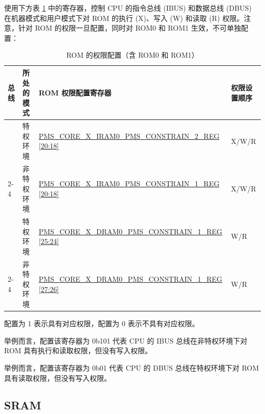 \documentclass[main\_\_CN.tex]{subfiles}
\begin{document}
\chipname{} 使用下方表 \ref{tab:permctrl-rom_permconfig} 中的寄存器，控制 CPU 的指令总线 (IBUS) 和数据总线 (DBUS) 在机器模式和用户模式下对 ROM 的执行 (X)、写入 (W) 和读取 (R) 权限。注意，针对 ROM 的权限一旦配置，同时对 ROM0 和 ROM1 生效，不可单独配置：

\begin{table}[H]
    \centering
    \caption{ROM 的权限配置（含 ROM0 和 ROM1）}
    \label{tab:permctrl-rom_permconfig}
    \begin{threeparttable}
    \begin{tabular}{|l|l|l|l|}
        \hline
        \rowcolor{lightgray}
        \textbf{总线} & \textbf{所处的模式} & \textbf{ROM 权限配置寄存器\tnote{A}}                         & \textbf{权限设置顺序} \\ \hline
                     & 特权环境      & \hyperref[regdesc:PMSCOREXIRAM0PMSCONSTRAIN2REG]{PMS\_CORE\_X\_IRAM0\_PMS\_CONSTRAIN\_2\_REG   {[}20:18{]}}\tnote{B} & X/W/R           \\ \cline{2-4}
        \multirow{-2}{*}{IBUS} & 非特权环境 & \hyperref[regdesc:PMSCOREXIRAM0PMSCONSTRAIN1REG]{PMS\_CORE\_X\_IRAM0\_PMS\_CONSTRAIN\_1\_REG {[}20:18{]}}\tnote{B}    & X/W/R \\ \hline
                     & 特权环境      & \hyperref[regdesc:PMSCOREXDRAM0PMSCONSTRAIN1REG]{PMS\_CORE\_X\_DRAM0\_PMS\_CONSTRAIN\_1\_REG   {[}25:24{]}}\tnote{C} & W/R             \\ \cline{2-4}
        \multirow{-2}{*}{DBUS} & 非特权环境 & \hyperref[regdesc:PMSCOREXDRAM0PMSCONSTRAIN1REG]{PMS\_CORE\_X\_DRAM0\_PMS\_CONSTRAIN\_1\_REG   {[}27:26{]}} & W/R   \\ \hline
        \end{tabular}
        \begin{tablenotes}
        \item[A] 配置为 1 表示具有对应权限，配置为 0 表示不具有对应权限。
        \item[B] 举例而言，配置该寄存器为 0b101 代表 CPU 的 IBUS 总线在非特权环境下对 ROM 具有执行和读取权限，但没有写入权限。
        \item[C] 举例而言，配置该寄存器为 0b01 代表 CPU 的 DBUS 总线在特权环境下对 ROM 具有读取权限，但没有写入权限。
        \end{tablenotes}
     \end{threeparttable}
    \end{table}

\subsection{SRAM}
\end{document}
